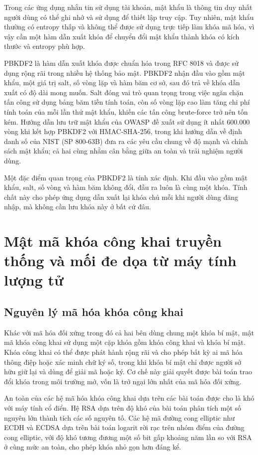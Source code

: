 Trong các ứng dụng nhắn tin sử dụng tài khoản, mật khẩu là thông tin duy nhất người dùng có thể ghi nhớ và sử dụng để thiết lập truy cập. Tuy nhiên, mật khẩu thường có entropy thấp và không thể được sử dụng trực tiếp làm khóa mã hóa, vì vậy cần một hàm dẫn xuất khóa để chuyển đổi mật khẩu thành khóa có kích thước và entropy phù hợp.

PBKDF2 là hàm dẫn xuất khóa được chuẩn hóa trong RFC 8018 và được sử dụng rộng rãi trong nhiều hệ thống bảo mật. PBKDF2 nhận đầu vào gồm mật khẩu, một giá trị salt, số vòng lặp và hàm băm cơ sở, sau đó trả về khóa dẫn xuất có độ dài mong muốn. Salt đóng vai trò quan trọng trong việc ngăn chặn tấn công sử dụng bảng băm tiền tính toán, còn số vòng lặp cao làm tăng chi phí tính toán của mỗi lần thử mật khẩu, khiến các tấn công brute-force trở nên tốn kém. Hướng dẫn lưu trữ mật khẩu của OWASP đề xuất sử dụng ít nhất 600.000 vòng khi kết hợp PBKDF2 với HMAC-SHA-256, trong khi hướng dẫn về định danh số của NIST (SP 800-63B) đưa ra các yêu cầu chung về độ mạnh và chính sách mật khẩu; cả hai cùng nhằm cân bằng giữa an toàn và trải nghiệm người dùng.

Một đặc điểm quan trọng của PBKDF2 là tính xác định. Khi đầu vào gồm mật khẩu, salt, số vòng và hàm băm không đổi, đầu ra luôn là cùng một khóa. Tính chất này cho phép ứng dụng dẫn xuất lại khóa chủ mỗi khi người dùng đăng nhập, mà không cần lưu khóa này ở bất cứ đâu.

\section{Mật mã khóa công khai truyền thống và mối đe dọa từ máy tính lượng tử}

\subsection{Nguyên lý mã hóa khóa công khai}

Khác với mã hóa đối xứng trong đó cả hai bên dùng chung một khóa bí mật, mật mã khóa công khai sử dụng một cặp khóa gồm khóa công khai và khóa bí mật. Khóa công khai có thể được phát hành rộng rãi và cho phép bất kỳ ai mã hóa thông điệp hoặc xác minh chữ ký số, trong khi khóa bí mật chỉ được người sở hữu giữ lại và dùng để giải mã hoặc ký. Cơ chế này giải quyết được bài toán trao đổi khóa trong môi trường mở, vốn là trở ngại lớn nhất của mã hóa đối xứng.

An toàn của các hệ mã hóa khóa công khai dựa trên các bài toán được cho là khó với máy tính cổ điển. Hệ RSA dựa trên độ khó của bài toán phân tích một số nguyên lớn thành tích các số nguyên tố. Các hệ mã đường cong elliptic như ECDH và ECDSA dựa trên bài toán logarit rời rạc trên nhóm điểm của đường cong elliptic, với độ khó tương đương một số bit gấp khoảng năm lần so với RSA ở cùng mức an toàn, cho phép khóa nhỏ gọn hơn đáng kể.

